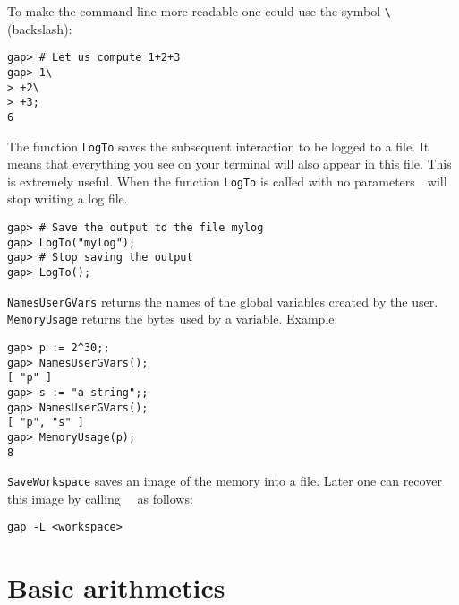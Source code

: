 To make the command line more readable one could use
the symbol \lstinline{\} (backslash):
\begin{lstlisting}
gap> # Let us compute 1+2+3
gap> 1\
> +2\
> +3;
6
\end{lstlisting}

The function \lstinline{LogTo} saves the subsequent interaction to be logged to
a file. It means that everything you see on your terminal will also appear in
this file. This is extremely useful.  When the function \lstinline{LogTo} is
called with no parameters~\GAP~will stop writing a log file.
\begin{lstlisting}
gap> # Save the output to the file mylog
gap> LogTo("mylog");
gap> # Stop saving the output
gap> LogTo();
\end{lstlisting}

\lstinline{NamesUserGVars} returns the names 
of the global variables created by the user. \lstinline{MemoryUsage} returns 
the bytes used by a variable. Example:
\begin{lstlisting}
gap> p := 2^30;;
gap> NamesUserGVars();
[ "p" ]
gap> s := "a string";;
gap> NamesUserGVars();
[ "p", "s" ]
gap> MemoryUsage(p);
8
\end{lstlisting}

\lstinline{SaveWorkspace} saves an image of the memory into a file.  Later one
can recover this image by calling~\GAP~ as follows: 
\begin{lstlisting}
gap -L <workspace>
\end{lstlisting}


\section{Basic arithmetics}

